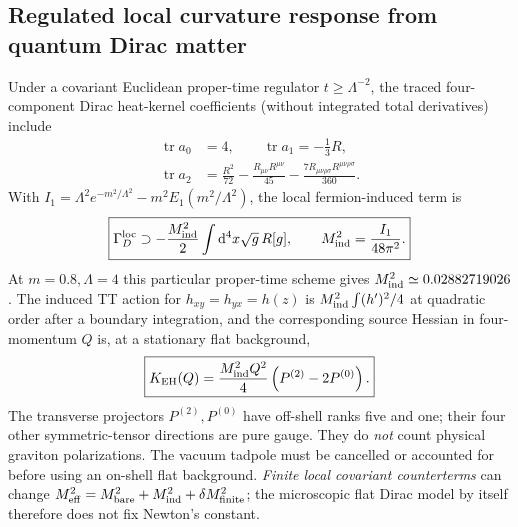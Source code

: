 \documentclass[11pt,a4paper]{article}
\newcommand{\dd}{\mathrm d}
\begin{document}
\subsection{Regulated local curvature response from quantum Dirac matter}
\label{sec:qgd075-heat}
Under a covariant Euclidean proper-time regulator $t\ge\Lambda^{-2}$,
the traced four-component Dirac heat-kernel coefficients (without
integrated total derivatives) include
\begin{equation}\label{eq:qgd075-heat}
 \boxed{\begin{aligned}
 \operatorname{tr}a_0&=4,\qquad\operatorname{tr}a_1=-\frac13R,\\
 \operatorname{tr}a_2&=\frac{R^2}{72}
 -\frac{R_{\mu\nu}R^{\mu\nu}}{45}
 -\frac{7R_{\mu\nu\rho\sigma}R^{\mu\nu\rho\sigma}}{360}.
 \end{aligned}}
\end{equation}
With $I_1=\Lambda^2e^{-m^2/\Lambda^2}
-m^2E_1(m^2/\Lambda^2)$, the local fermion-induced term is
\begin{equation}\label{eq:qgd075-induced-EH}
 \boxed{\Gamma_D^{\rm loc}\supset-\frac{M_{\rm ind}^2}{2}
 \int\dd^4x\sqrt g\,R[g],\qquad
 M_{\rm ind}^2=\frac{I_1}{48\pi^2}.}
\end{equation}
At $m=0.8,\Lambda=4$ this particular proper-time scheme gives
$M_{\rm ind}^2\simeq0.02882719026$. The induced TT action for
$h_{xy}=h_{yx}=h(z)$ is $M_{\rm ind}^2\int(h')^2/4$ at quadratic
order after a boundary integration, and the corresponding source
Hessian in four-momentum $Q$ is, at a stationary flat background,
\begin{equation}\label{eq:qgd075-induced-kernel}
 \boxed{K_{\rm EH}(Q)=\frac{M_{\rm ind}^2Q^2}{4}
 \left(P^{(2)}-2P^{(0)}\right).}
\end{equation}
The transverse projectors $P^{(2)},P^{(0)}$ have off-shell
ranks five and one; their four other symmetric-tensor directions are
pure gauge. They do \emph{not} count physical graviton polarizations.
The vacuum tadpole must be cancelled or accounted for before using
an on-shell flat background. \emph{Finite local covariant
counterterms} can change $M_{\rm eff}^2=M_{\rm bare}^2+
M_{\rm ind}^2+\delta M_{\rm finite}^2$; the microscopic flat Dirac
model by itself therefore does not fix Newton's constant.
\end{document}
